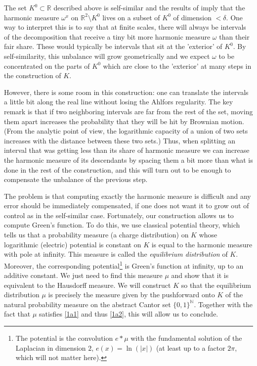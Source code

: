 \documentclass[JEP,XML,SOM,Unicode,published]{cedram}
\let\sm\setminus
\numberwithin{equation}{section}
\theoremstyle{plain}
\theoremstyle{definition}
\newcommand{\R}{\mathbb{R}}
\let\sm\setminus
\newcommand{\R}{\mathbb{R}}
\newcommand{\bN}{\mathbb{N}}
\begin{document}
The set $K^0 \subset \R$ described above is self-similar and the results of \cite{BatakisZdunik2015}
imply that the harmonic measure $\omega^x$ on $\R^2 \sm K^0$
lives on a subset of $K^0$ of dimension $< \delta$. One way to interpret this is to say that
at finite scales, there will always be intervals of the decomposition that receive
a tiny bit more harmonic measure $\omega$ than their fair share.
These would typically be intervals that sit at the 'exterior' of $K^0$.
By self-similarity, this unbalance will grow geometrically and we expect $\omega$
to be concentrated on the parts of $K^0$ which are close to the 'exterior' at many steps in the construction of $K$.

However, there is some room in this construction: one can translate the intervals a little bit along the real
line without losing the Ahlfors regularity. The key remark is that if two neighboring intervals are far from the rest of the set,
moving them apart increases the probability that they will be hit by Brownian motion. (From the analytic point of view,
the logarithmic capacity of a union of two sets increases with the distance between these two sets.)
Thus, when splitting an interval that was getting less than its share of harmonic measure we can increase
the harmonic measure of its descendants by spacing them a bit more than what is done
in the rest of the construction, and this will turn
out to be enough to compensate the unbalance of the previous step.

The problem is that computing exactly the harmonic measure is difficult and any error should be immediately compensated,
if one does not want it to grow out of control as in the self-similar case.
Fortunately, our construction allows us to compute Green's function.
To do this, we use classical potential theory, which tells us that a probability measure (a charge distribution) on $K$
whose logarithmic (electric) potential is constant on $K$ is equal to the harmonic measure with pole at infinity.
This measure is called the \emph{equilibrium distribution} of $K$.
Moreover, the corresponding potential\footnote{The potential is the convolution $e \ast \mu$ with the fundamental solution of the Laplacian in dimension $2$, $e(x) = \ln(|x|)$ (at least up to a factor $2\pi$, which will not matter here).}
is Green's function at infinity, up to an additive constant.
We just need to find this measure $\mu$ and show that it is equivalent to the Hausdorff measure.
We will construct $K$ so that the equilibrium distribution $\mu$ is precisely the measure given by the pushforward onto $K$ of the natural probability measure on the abstract Cantor set $\{0,1\}^{\bN}$. Together with the fact that $\mu$ satisfies \eqref{1a1} and thus \eqref{1a2}, this will allow us to conclude.
\end{document}
